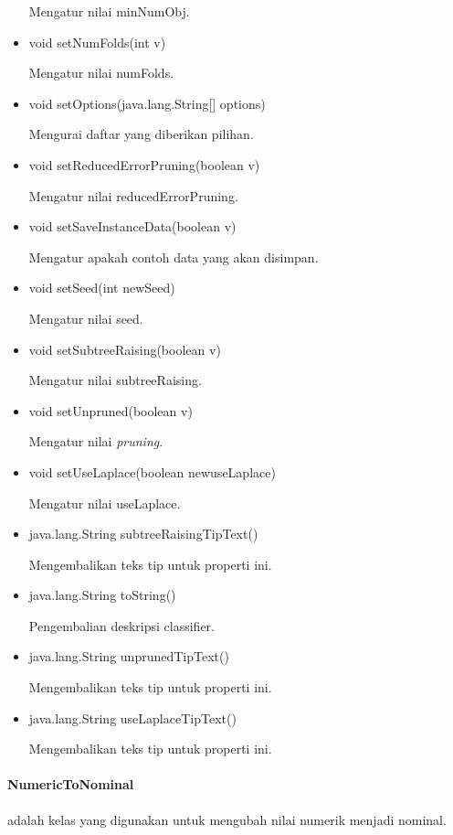 \begin{itemize}
	Mengatur nilai minNumObj.
	
	\item void setNumFolds(int v)
	
	Mengatur nilai numFolds.
	
	\item void setOptions(java.lang.String[] options)
	
	Mengurai daftar yang diberikan pilihan.
	
	\item void setReducedErrorPruning(boolean v)
	
	Mengatur nilai reducedErrorPruning.
	
	\item void setSaveInstanceData(boolean v)
	
	Mengatur apakah contoh data yang akan disimpan.
	
	\item void setSeed(int newSeed)
	
	Mengatur nilai seed.
	
	\item void setSubtreeRaising(boolean v)
	
	Mengatur nilai subtreeRaising.
	
	\item void setUnpruned(boolean v)
	
	Mengatur nilai \textsl{pruning}.
	
	\item void setUseLaplace(boolean newuseLaplace)
	
	Mengatur nilai useLaplace.
	
	\item java.lang.String subtreeRaisingTipText()
	
	Mengembalikan teks tip untuk properti ini.
	
	\item java.lang.String toString()
	
	Pengembalian deskripsi classifier.
	
	\item java.lang.String unprunedTipText()
	
	Mengembalikan teks tip untuk properti ini.
	
	\item java.lang.String useLaplaceTipText()
	
	Mengembalikan teks tip untuk properti ini.
\end{itemize}

\paragraph{NumericToNominal} adalah kelas yang digunakan untuk mengubah nilai numerik menjadi nominal.

